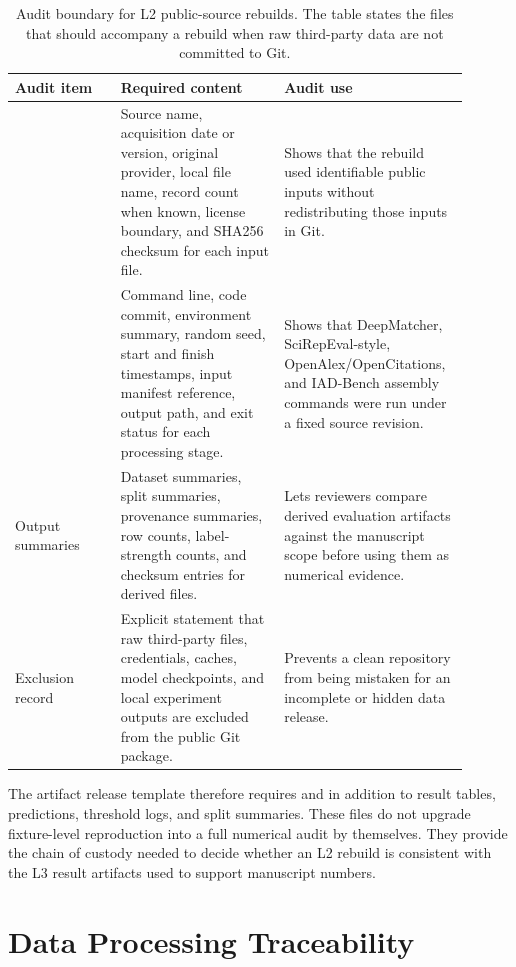 \documentclass[11pt]{article}
\begin{document}
\begin{table}[H]
\caption{Audit boundary for L2 public-source rebuilds. The table states the files that should accompany a rebuild when raw third-party data are not committed to Git.}
\label{tab:public-source-rebuild-audit-boundary}
\centering
\footnotesize
\setlength{\tabcolsep}{3pt}
\begin{tabular}{L{0.22\linewidth}L{0.34\linewidth}L{0.34\linewidth}}
\toprule
Audit item & Required content & Audit use \\
\midrule
{} & Source name, acquisition date or version, original provider, local file name, record count when known, license boundary, and SHA256 checksum for each input file. & Shows that the rebuild used identifiable public inputs without redistributing those inputs in Git. \\
 & Command line, code commit, environment summary, random seed, start and finish timestamps, input manifest reference, output path, and exit status for each processing stage. & Shows that DeepMatcher, SciRepEval-style, OpenAlex/OpenCitations, and IAD-Bench assembly commands were run under a fixed source revision. \\
Output summaries & Dataset summaries, split summaries, provenance summaries, row counts, label-strength counts, and checksum entries for derived files. & Lets reviewers compare derived evaluation artifacts against the manuscript scope before using them as numerical evidence. \\
Exclusion record & Explicit statement that raw third-party files, credentials, caches, model checkpoints, and local experiment outputs are excluded from the public Git package. & Prevents a clean repository from being mistaken for an incomplete or hidden data release. \\
\bottomrule
\end{tabular}
\end{table}

The artifact release template therefore requires  and  in addition to result tables, predictions, threshold logs, and split summaries. These files do not upgrade fixture-level reproduction into a full numerical audit by themselves. They provide the chain of custody needed to decide whether an L2 rebuild is consistent with the L3 result artifacts used to support manuscript numbers.

\section{Data Processing Traceability}
\end{document}
